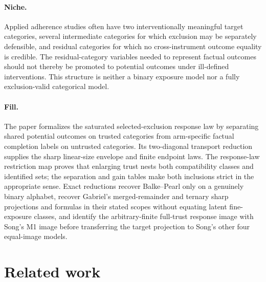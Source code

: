 \documentclass{article}
\begin{document}
\paragraph{Niche.} Applied adherence studies often have two interventionally meaningful target categories, several intermediate categories for which exclusion may be separately defensible, and residual categories for which no cross-instrument outcome equality is credible. The residual-category variables needed to represent factual outcomes should not thereby be promoted to potential outcomes under ill-defined interventions. This structure is neither a binary exposure model nor a fully exclusion-valid categorical model.

\paragraph{Fill.} The paper formalizes the saturated selected-exclusion response law by separating shared potential outcomes on trusted categories from arm-specific factual completion labels on untrusted categories. Its two-diagonal transport reduction supplies the sharp linear-size envelope and finite endpoint laws. The response-law restriction map proves that enlarging trust nests both compatibility classes and identified sets; the separation and gain tables make both inclusions strict in the appropriate sense. Exact reductions recover Balke--Pearl only on a genuinely binary alphabet, recover Gabriel's merged-remainder and ternary sharp projections and formulas in their stated scopes without equating latent fine-exposure classes, and identify the arbitrary-finite full-trust response image with Song's M1 image before transferring the target projection to Song's other four equal-image models.

\section{Related work}
\end{document}
